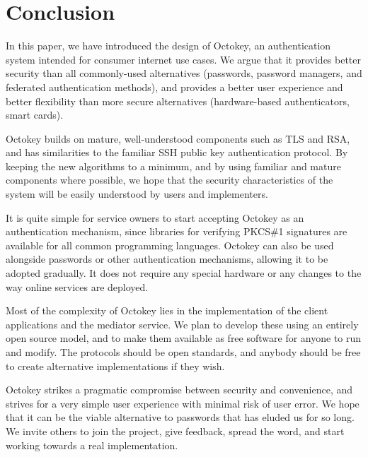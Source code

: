 %
%
%

\section{Conclusion}

In this paper, we have introduced the design of Octokey, an authentication system intended for
consumer internet use cases. We argue that it provides better security than all commonly-used
alternatives (passwords, password managers, and federated authentication methods), and provides a
better user experience and better flexibility than more secure alternatives (hardware-based
authenticators, smart cards).

Octokey builds on mature, well-understood components such as TLS and RSA, and has similarities to
the familiar SSH public key authentication protocol. By keeping the new algorithms to a minimum, and
by using familiar and mature components where possible, we hope that the security characteristics of
the system will be easily understood by users and implementers.

It is quite simple for service owners to start accepting Octokey as an authentication mechanism,
since libraries for verifying PKCS\#1 signatures are available for all common programming languages.
Octokey can also be used alongside passwords or other authentication mechanisms, allowing it to be
adopted gradually. It does not require any special hardware or any changes to the way online
services are deployed.

Most of the complexity of Octokey lies in the implementation of the client applications and the
mediator service. We plan to develop these using an entirely open source model, and to make them
available as free software for anyone to run and modify. The protocols should be open standards, and
anybody should be free to create alternative implementations if they wish.

Octokey strikes a pragmatic compromise between security and convenience, and strives for a very
simple user experience with minimal risk of user error. We hope that it can be the viable
alternative to passwords that has eluded us for so long. We invite others to join the project, give
feedback, spread the word, and start working towards a real implementation.
